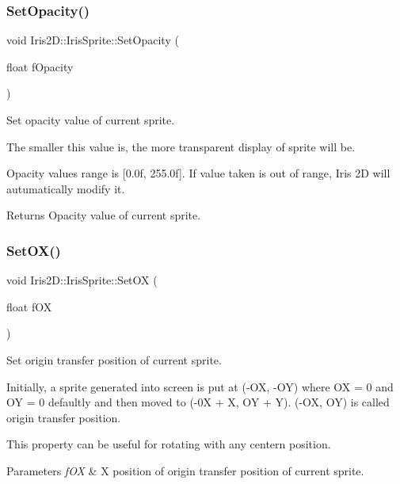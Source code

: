 \subsubsection{\texorpdfstring{Set\+Opacity()}{SetOpacity()}}
{\footnotesize\ttfamily void Iris2\+D\+::\+Iris\+Sprite\+::\+Set\+Opacity (\begin{DoxyParamCaption}\item[{float}]{f\+Opacity }\end{DoxyParamCaption})}



Set opacity value of current sprite. 

The smaller this value is, the more transparent display of sprite will be.

Opacity value\textquotesingle{}s range is \mbox{[}0.\+0f, 255.\+0f\mbox{]}. If value taken is out of range, Iris 2D will autumatically modify it.

\begin{DoxyReturn}{Returns}
Opacity value of current sprite. 
\end{DoxyReturn}
\mbox{\label{class_iris2_d_1_1_iris_sprite_ae4b2cbedd03a92ac0b68b9e701df2e68}} 
\subsubsection{\texorpdfstring{Set\+O\+X()}{SetOX()}}
{\footnotesize\ttfamily void Iris2\+D\+::\+Iris\+Sprite\+::\+Set\+OX (\begin{DoxyParamCaption}\item[{float}]{f\+OX }\end{DoxyParamCaption})}



Set origin transfer position of current sprite. 

Initially, a sprite generated into screen is put at (-\/\+OX, -\/\+OY) where OX = 0 and OY = 0 defaultly and then moved to (-\/0X + X, OY + Y). (-\/\+OX, OY) is called origin transfer position.

This property can be useful for rotating with any centern position. 
\begin{DoxyParams}{Parameters}
{\em f\+OX} & X position of origin transfer position of current sprite. \\
\hline
\end{DoxyParams}
\mbox{\label{class_iris2_d_1_1_iris_sprite_a6dba8492659c67a9c09359ed321a89b3}} 
